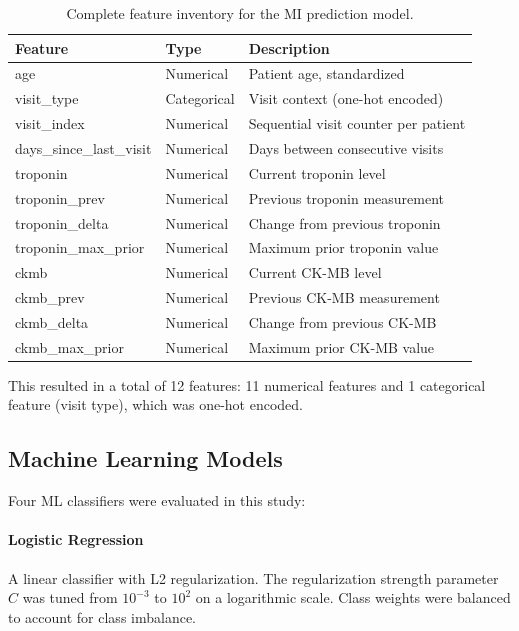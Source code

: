 \documentclass[fleqn,10pt,lineno]{wlpeerj}
\begin{document}
\begin{table}[ht]
\small
\begin{tabularx}{\linewidth}{llL}
\toprule
\textbf{Feature} & \textbf{Type} & \textbf{Description} \\
\midrule
age & Numerical & Patient age, standardized \\
visit\_type & Categorical & Visit context (one-hot encoded) \\
visit\_index & Numerical & Sequential visit counter per patient \\
days\_since\_last\_visit & Numerical & Days between consecutive visits \\
troponin & Numerical & Current troponin level \\
troponin\_prev & Numerical & Previous troponin measurement \\
troponin\_delta & Numerical & Change from previous troponin \\
troponin\_max\_prior & Numerical & Maximum prior troponin value \\
ckmb & Numerical & Current CK-MB level \\
ckmb\_prev & Numerical & Previous CK-MB measurement \\
ckmb\_delta & Numerical & Change from previous CK-MB \\
ckmb\_max\_prior & Numerical & Maximum prior CK-MB value \\
\bottomrule
\end{tabularx}
\caption{Complete feature inventory for the MI prediction model.}
\label{tab:features}
\end{table}

This resulted in a total of 12 features: 11 numerical features and 1 categorical feature (visit type), which was one-hot encoded.

\subsection*{Machine Learning Models}

Four ML classifiers were evaluated in this study:

\paragraph{Logistic Regression}
A linear classifier with L2 regularization. The regularization strength parameter $C$ was tuned from $10^{-3}$ to $10^2$ on a logarithmic scale. Class weights were balanced to account for class imbalance.
\end{document}
